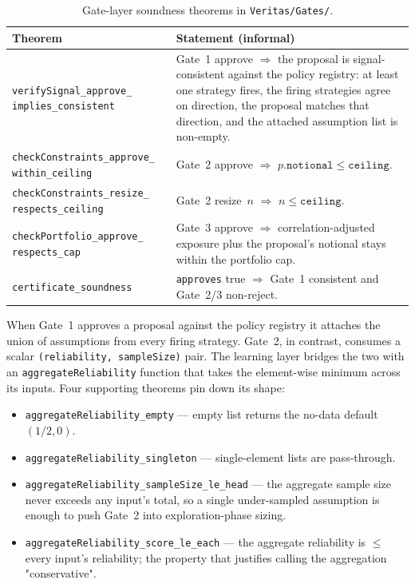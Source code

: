 \documentclass[11pt, a4paper]{article}
\begin{document}
\begin{table}[h]
\footnotesize
\begin{tabularx}{\linewidth}{@{}lX@{}}
\toprule
Theorem & Statement (informal) \\
\midrule
\texttt{verifySignal\_approve\_}
\texttt{implies\_consistent}
  & Gate~1 approve $\Rightarrow$ the proposal is signal-consistent
    against the policy registry: at least one strategy fires, the
    firing strategies agree on direction, the proposal matches that
    direction, and the attached assumption list is non-empty. \\[4pt]
\texttt{checkConstraints\_approve\_}
\texttt{within\_ceiling}
  & Gate~2 approve $\Rightarrow$ $p.\texttt{notional} \leq \texttt{ceiling}$. \\[4pt]
\texttt{checkConstraints\_resize\_}
\texttt{respects\_ceiling}
  & Gate~2 resize~$n$ $\Rightarrow$ $n \leq \texttt{ceiling}$. \\[4pt]
\texttt{checkPortfolio\_approve\_}
\texttt{respects\_cap}
  & Gate~3 approve $\Rightarrow$ correlation-adjusted exposure plus
    the proposal's notional stays within the portfolio cap. \\[4pt]
\texttt{certificate\_soundness}
  & \texttt{approves} true $\Rightarrow$ Gate~1 consistent and Gate~2/3
    non-reject. \\
\bottomrule
\end{tabularx}
\caption{Gate-layer soundness theorems in \texttt{Veritas/Gates/}.}
\label{tab:thms}
\end{table}

When Gate~1 approves a proposal against the policy registry it attaches
the union of assumptions from every firing strategy. Gate~2, in
contrast, consumes a scalar \texttt{(reliability, sampleSize)} pair.
The learning layer bridges the two with an \texttt{aggregateReliability}
function that takes the element-wise minimum across its inputs. Four
supporting theorems pin down its shape:

\begin{itemize}[leftmargin=1.5em, itemsep=1pt, topsep=2pt]
\item \texttt{aggregateReliability\_empty} --- empty list returns the
      no-data default $(1/2, 0)$.
\item \texttt{aggregateReliability\_singleton} --- single-element
      lists are pass-through.
\item \texttt{aggregateReliability\_sampleSize\_le\_head} --- the
      aggregate sample size never exceeds any input's total, so a
      single under-sampled assumption is enough to push Gate~2 into
      exploration-phase sizing.
\item \texttt{aggregateReliability\_score\_le\_each} --- the
      aggregate reliability is $\leq$ every input's reliability; the
      property that justifies calling the aggregation "conservative".
\end{itemize}
\end{document}
